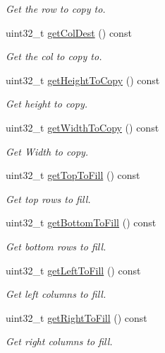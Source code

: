 \begin{DoxyCompactItemize}
\begin{DoxyCompactList}\small\item\em Get the row to copy to. \end{DoxyCompactList}\item 
uint32\+\_\+t \hyperlink{classfi_1_1HTGSTileRequestData_a2715f7cae917ededbc0bad0a20aa3e24}{get\+Col\+Dest} () const
\begin{DoxyCompactList}\small\item\em Get the col to copy to. \end{DoxyCompactList}\item 
uint32\+\_\+t \hyperlink{classfi_1_1HTGSTileRequestData_ab462c8ff5dd1a961edb22d854095018a}{get\+Height\+To\+Copy} () const
\begin{DoxyCompactList}\small\item\em Get height to copy. \end{DoxyCompactList}\item 
uint32\+\_\+t \hyperlink{classfi_1_1HTGSTileRequestData_ae368851c9c926aa576828ffc020d3f03}{get\+Width\+To\+Copy} () const
\begin{DoxyCompactList}\small\item\em Get Width to copy. \end{DoxyCompactList}\item 
uint32\+\_\+t \hyperlink{classfi_1_1HTGSTileRequestData_a05410cec078e3d5358b583e2e1fbb472}{get\+Top\+To\+Fill} () const
\begin{DoxyCompactList}\small\item\em Get top rows to fill. \end{DoxyCompactList}\item 
uint32\+\_\+t \hyperlink{classfi_1_1HTGSTileRequestData_a08367261b74f7161b178ae2fb7731465}{get\+Bottom\+To\+Fill} () const
\begin{DoxyCompactList}\small\item\em Get bottom rows to fill. \end{DoxyCompactList}\item 
uint32\+\_\+t \hyperlink{classfi_1_1HTGSTileRequestData_ae708e4fbcd565fec5ac38f866b4754b7}{get\+Left\+To\+Fill} () const
\begin{DoxyCompactList}\small\item\em Get left columns to fill. \end{DoxyCompactList}\item 
uint32\+\_\+t \hyperlink{classfi_1_1HTGSTileRequestData_a4fd101f0427e4712157d096e739dcd84}{get\+Right\+To\+Fill} () const
\begin{DoxyCompactList}\small\item\em Get right columns to fill. \end{DoxyCompactList}\item 

\end{DoxyCompactItemize}
